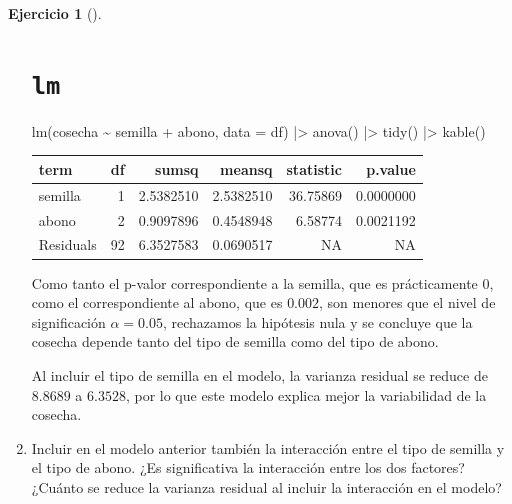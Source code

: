 \documentclass[
  a4paper,
]{scrreport}
\newenvironment{Shaded}{\begin{snugshade}}{\end{snugshade}}
\newcommand{\AttributeTok}[1]{\textcolor[rgb]{0.40,0.45,0.13}{#1}}
\newcommand{\FunctionTok}[1]{\textcolor[rgb]{0.28,0.35,0.67}{#1}}
\newcommand{\NormalTok}[1]{\textcolor[rgb]{0.00,0.23,0.31}{#1}}
\newcommand{\SpecialCharTok}[1]{\textcolor[rgb]{0.37,0.37,0.37}{#1}}
\theoremstyle{definition}
\newtheorem{exercise}{Ejercicio}[chapter]
\theoremstyle{remark}
\begin{document}
\begin{exercise}[]
\begin{enumerate}
\begin{tcolorbox}
  \section{\texorpdfstring{\texttt{lm}}{lm}}

\begin{Shaded}
\begin{Highlighting}[]
\FunctionTok{lm}\NormalTok{(cosecha }\SpecialCharTok{\textasciitilde{}}\NormalTok{ semilla }\SpecialCharTok{+}\NormalTok{ abono, }\AttributeTok{data =}\NormalTok{ df) }\SpecialCharTok{|\textgreater{}} 
    \FunctionTok{anova}\NormalTok{() }\SpecialCharTok{|\textgreater{}} 
    \FunctionTok{tidy}\NormalTok{() }\SpecialCharTok{|\textgreater{}} 
    \FunctionTok{kable}\NormalTok{()}
\end{Highlighting}
\end{Shaded}

  \begin{longtable}[]{@{}lrrrrr@{}}
  \toprule\noalign{}
  term & df & sumsq & meansq & statistic & p.value \\
  \midrule\noalign{}
  \endhead
  \bottomrule\noalign{}
  \endlastfoot
  semilla & 1 & 2.5382510 & 2.5382510 & 36.75869 & 0.0000000 \\
  abono & 2 & 0.9097896 & 0.4548948 & 6.58774 & 0.0021192 \\
  Residuals & 92 & 6.3527583 & 0.0690517 & NA & NA \\
  \end{longtable}

  Como tanto el p-valor correspondiente a la semilla, que es
  prácticamente \(0\), como el correspondiente al abono, que es
  \(0.002\), son menores que el nivel de significación \(\alpha=0.05\),
  rechazamos la hipótesis nula y se concluye que la cosecha depende
  tanto del tipo de semilla como del tipo de abono.

  Al incluir el tipo de semilla en el modelo, la varianza residual se
  reduce de \(8.8689\) a \(6.3528\), por lo que este modelo explica
  mejor la variabilidad de la cosecha.

  \end{tcolorbox}
\item
  Incluir en el modelo anterior también la interacción entre el tipo de
  semilla y el tipo de abono. ¿Es significativa la interacción entre los
  dos factores? ¿Cuánto se reduce la varianza residual al incluir la
  interacción en el modelo?

  \begin{tcolorbox}[enhanced jigsaw, colframe=quarto-callout-note-color-frame, toprule=.15mm, bottomtitle=1mm, breakable, opacitybacktitle=0.6, toptitle=1mm, colback=white, bottomrule=.15mm, title=\textcolor{quarto-callout-note-color}{\faInfo}\hspace{0.5em}{Ayuda}, arc=.35mm, left=2mm, titlerule=0mm, rightrule=.15mm, coltitle=black, leftrule=.75mm, opacityback=0, colbacktitle=quarto-callout-note-color!10!white]


\end{tcolorbox}
\end{enumerate}
\end{exercise}
\end{document}
